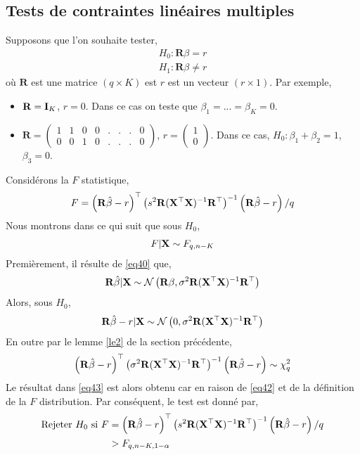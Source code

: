 \subsection{Tests de contraintes linéaires multiples}
Supposons que l'on souhaite tester,
\begin{align*}
H_0: \mathbf{R}\beta = r\\
H_1: \mathbf{R}\beta \neq r
\end{align*}
où $\mathbf{R}$ est une matrice $(q \times K)$ est $r$ est un vecteur $(r\times 1)$. Par exemple, 
\begin{itemize}[label = - ]
\item $\mathbf{R} = \mathbf{I}_K$, $r=0$. Dans ce cas on teste que $\beta_1=...=\beta_K=0$.
\item $\mathbf{R} = \left(
\begin{array}{cccccccc}
1&1&0&0&.&.&.&0\\
0&0&1&0&.&.&.&0
\end{array}
\right)$, $r = \left(\begin{array}{c}
1\\
0
\end{array}
\right)
$. Dans ce cas, $H_0: \beta_1 + \beta_2 = 1$, $\beta_3=0$.
\end{itemize}
Considérons la $F$ statistique,
\begin{align*}
F = \left(\mathbf{R}\hat{\beta} - r\right)^\top\left(s^2\mathbf{R}(\mathbf X^\top\mathbf X)^{-1}\mathbf{R}^\top\right)^{-1}\left(\mathbf{R}\hat{\beta} - r\right)/q
\end{align*}
Nous montrons dans ce qui suit que sous $H_0$,
\begin{align}
F | \mathbf X \sim F_{q, n-K}
\label{eq43}
\end{align}
Premièrement, il résulte de \eqref{eq40} que,
\begin{align*}
\mathbf{R}\hat{\beta} | \mathbf X \sim\mathcal{N}\left(\mathbf{R}\beta, \sigma^2\mathbf{R}(\mathbf X^\top\mathbf X)^{-1}\mathbf{R}^\top\right)
\end{align*}
Alors, sous $H_0$,
\begin{align*}
\mathbf{R}\hat{\beta} - r | \mathbf X \sim\mathcal{N}\left(0, \sigma^2\mathbf{R}(\mathbf X^\top\mathbf X)^{-1}\mathbf{R}^\top\right)
\end{align*}
En outre par le lemme \eqref{le2} de la section précédente,
\begin{align*}
\left(\mathbf{R}\hat{\beta} - r\right)^\top\left(\sigma^2\mathbf{R}(\mathbf X^\top\mathbf X)^{-1}\mathbf{R}^\top\right)^{-1}\left(\mathbf{R}\hat{\beta} - r\right)\sim\chi^2_q
\end{align*}
Le résultat dans \eqref{eq43} est alors obtenu car en raison de \eqref{eq42} et de la définition de la $F$ distribution. Par conséquent, le test est donné par,
\begin{align*}
\textrm{Rejeter} \ H_0 \ \textrm{si} \ F &= \left(\mathbf{R}\hat{\beta} - r\right)^\top\left(s^2\mathbf{R}(\mathbf X^\top\mathbf X)^{-1}\mathbf{R}^\top\right)^{-1}\left(\mathbf{R}\hat{\beta} - r\right)/q\\
&> F_{q, n-K, 1-\alpha} 
\end{align*}

